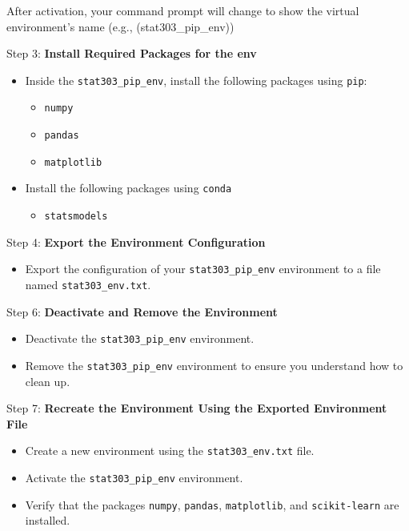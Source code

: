 \documentclass[
  letterpaper,
  DIV=11,
  numbers=noendperiod]{scrreprt}
\providecommand{\tightlist}{%
  \setlength{\itemsep}{0pt}\setlength{\parskip}{0pt}}\usepackage{longtable,booktabs,array}
\begin{document}
After activation, your command prompt will change to show the virtual
environment's name (e.g., (stat303\_pip\_env))

Step 3: \textbf{Install Required Packages for the env}

\begin{itemize}
\tightlist
\item
  Inside the \texttt{stat303\_pip\_env}, install the following packages
  using \texttt{pip}:

  \begin{itemize}
  \tightlist
  \item
    \texttt{numpy}
  \item
    \texttt{pandas}
  \item
    \texttt{matplotlib}
  \end{itemize}
\item
  Install the following packages using \texttt{conda}

  \begin{itemize}
  \tightlist
  \item
    \texttt{statsmodels}
  \end{itemize}
\end{itemize}

Step 4: \textbf{Export the Environment Configuration}

\begin{itemize}
\tightlist
\item
  Export the configuration of your \texttt{stat303\_pip\_env}
  environment to a file named \texttt{stat303\_env.txt}.
\end{itemize}

Step 6: \textbf{Deactivate and Remove the Environment}

\begin{itemize}
\tightlist
\item
  Deactivate the \texttt{stat303\_pip\_env} environment.
\item
  Remove the \texttt{stat303\_pip\_env} environment to ensure you
  understand how to clean up.
\end{itemize}

Step 7: \textbf{Recreate the Environment Using the Exported Environment
File}

\begin{itemize}
\tightlist
\item
  Create a new environment using the \texttt{stat303\_env.txt} file.
\item
  Activate the \texttt{stat303\_pip\_env} environment.
\item
  Verify that the packages \texttt{numpy}, \texttt{pandas},
  \texttt{matplotlib}, and \texttt{scikit-learn} are installed.
\end{itemize}
\end{document}
